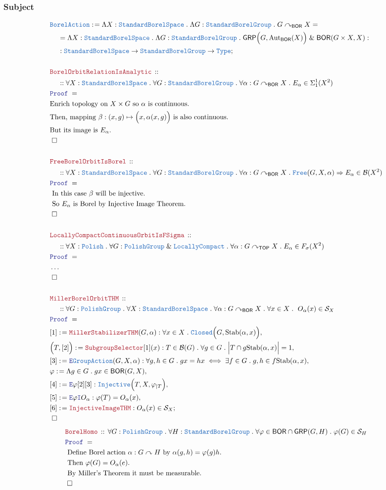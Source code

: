 \documentclass[12pt]{scrartcl}
\newcommand{\TYPE}[1]{\textcolor{NavyBlue}{\mathtt{#1}}}
\newcommand{\LOGIC}[1]{\textcolor{Blue}{\mathtt{#1}}}
\newcommand{\THM}[1]{\textcolor{Maroon}{\mathtt{#1}}}
\renewcommand{\.}{\; . \;}
\newcommand{\de}{: \kern 0.1pc =}
\newcommand{\Theorem}[2]{& \THM{#1} \, :: \, #2 \\ & \Proof = \\ }
\newcommand{\NewLine}{\\ & \kern 1pc}
\newcommand{\Page}[1]{ \begin{align*} #1 \end{align*}   }
\newcommand{\NoProof}{ & \ldots \\ \EndProof}
\renewcommand{\And}{\; \& \;}
\newcommand{\Imply}{\Rightarrow}
\newcommand{\Type}{\TYPE{Type}}
\newcommand{\Aut}{\mathrm{Aut}}
\newcommand{\Inj}{\TYPE{Injective}}
\newcommand{\Say}[3]{& #1 \de #2 : #3, \\}
\newcommand{\SayIn}[3]{& #1 \de #2 \in #3, \\}
\newcommand{\Conclude}[3]{& #1 \de #2 : #3; \\}
\newcommand{\Explain}[1]{& \text{#1.} \\}
\newcommand{\Intro}{\LOGIC{I}}
\newcommand{\Elim}{\LOGIC{E}}
\newcommand{\QED}{\; \square}
\newcommand{\EndProof}{& \QED \\}
\newcommand{\Proof}{\LOGIC{Proof} \; }
\newcommand{\B}{\mathcal{B}}
\newcommand{\Closed}{\TYPE{Closed}}
\newcommand{\LC}{\TYPE{LocallyCompact}}
\newcommand{\TOP}{\mathsf{TOP}}
\newcommand{\Polish}{\TYPE{Polish}}
\newcommand{\SBS}{\TYPE{StandardBorelSpace}}
\newcommand{\BOR}{\mathsf{BOR}}
\renewcommand{\S}{\mathcal{S}}
\newcommand{\Stab}{\mathrm{Stab}}
\newcommand{\ActOn}{\curvearrowright}
\newcommand{\GRP}{\mathsf{GRP}}
\newcommand{\PG}{\TYPE{PolishGroup}}
\newcommand{\SBG}{\TYPE{StandardBorelGroup}}
\renewcommand{\S}{\mathcal{S}}
\begin{document}
\subsubsection{Subject}
\Page{
	\Conclude{\TYPE{BorelAction}}
	{
		\Lambda X : \SBS \.
		\Lambda G : \SBG \.
		G \ActOn_\BOR X 
		= \NewLine =
		\Lambda X : \SBS \.
		\Lambda G : \SBG \.
		\GRP\Big(G, \Aut_\BOR(X)\Big)
		\And
		\BOR(G\times X,X)
	}
	{
		\NewLine :		
		\SBS \to \SBG \to \Type
	}
	\\
	\Theorem{BorelOrbitRelationIsAnalytic}
	{
		\NewLine ::		
		\forall X : \SBS \.
		\forall G : \SBG \.
		\forall \alpha : G \ActOn_\BOR X \. 
		E_\alpha \in \Sigma^1_1(X^2)
	}
	\Explain{Enrich topology on $X \times G$ so $\alpha$ is continuous}
	\Explain{Then, mapping $\beta : (x,g) \mapsto \Big(x,\alpha(x,g)\Big)$ is also continuous}
	\Explain{But its image is $E_\alpha$}
	\EndProof
	\\
	\Theorem{FreeBorelOrbitIsBorel}
	{
		\NewLine ::
		\forall X : \SBS \.
		\forall G : \SBG \.
		\forall \alpha : G \ActOn_\BOR X \. 
		\TYPE{Free}(G,X,\alpha) 
		\Imply
		E_\alpha \in \B(X^2)
	}
	\Explain{ In this case $\beta$ will be injective}
	\Explain{ So $E_\alpha$ is Borel by Injective Image Theorem}
	\EndProof
	\\
	\Theorem{LocallyCompactContinuousOrbitIsFSigma}
	{
		\NewLine ::
		\forall X : \Polish \.
		\forall G : \PG \And \LC \.
		\forall \alpha : G \ActOn_\TOP X \. 
		E_\alpha \in F_\sigma(X^2)
	}
	\NoProof
	\\
	\Theorem{MillerBorelOrbitTHM}
	{
		\NewLine ::
		\forall G : \PG \.
		\forall X : \SBS \.
		\forall \alpha : G \ActOn_\BOR X \.
		\forall x \in X \.
\		O_\alpha(x) \in \S_X
	}	
	\Say{[1]}{\THM{MillerStabilizerTHM}(G,\alpha)}
	{
		\forall x \in X \. \Closed\Big(G, \Stab(\alpha,x)\Big)
	}
	\Say{\Big(T,[2]\Big)}{\THM{SubgroupSelector}[1](x)}
	{
		T \in \B(G) \.
		\forall g \in G \. 
		\Big| T \cap  g\Stab(\alpha,x)\Big| = 1
	}
	\Say{[3]}{\Elim \TYPE{GroupAction}(G,X,\alpha)}
	{
		\forall g,h \in G \. 
		 gx = hx 
		 \iff
		 \exists f \in G \.
		 g,h \in f\Stab(\alpha,x)
	}
	\SayIn{\varphi}{\Lambda g \in G \. gx}{\BOR(G,X)}
	\Say{[4]}{\Elim \varphi [2][3]}
	{
		\Inj\Big(T,X,\varphi_{|T}\Big) 
	}
	\Say{[5]}{\Elim \varphi \Intro O_\alpha}{\varphi(T) = O_\alpha(x) }
	\Conclude{[6]}{\THM{InjectiveImageTHM}}
	{
		O_\alpha(x) \in \S_X
	}
	\EndProof
}
\Page{
	\Theorem{BorelHomo}
	{
		\forall G : \PG \.
		\forall H : \SBG \.
		\forall \varphi \in \BOR \cap \GRP(G,H) \.
		\varphi(G) \in \S_H		
	}
	\Explain{ Define Borel action $\alpha : G \ActOn H$ by $\alpha(g,h) = \varphi(g)h$}
	\Explain{  Then $\varphi(G) = O_\alpha(e)$}
	\Explain{ By Miller's Theorem it must be measurable}
	\EndProof
}
\newpage
\end{document}
